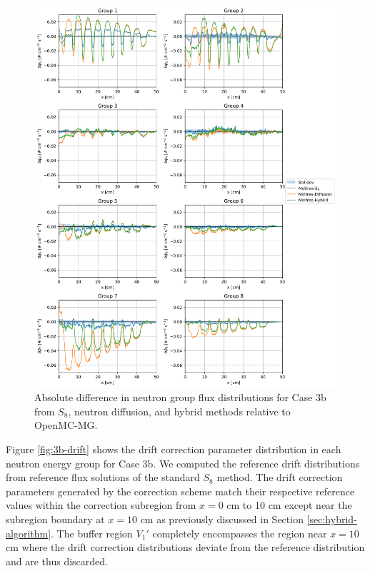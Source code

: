 \documentclass[letterpaper]{mc2025}
\begin{document}
\begin{figure}[htb!]
  \centering
  \includegraphics[width=\columnwidth]{case-3b-flux-diff}
  \caption{Absolute difference in neutron group flux distributions for Case 3b from $S_8$,
  neutron diffusion, and hybrid methods relative to OpenMC-MG.}
  \label{fig:3b-flux-diff}
\end{figure}

Figure \ref{fig:3b-drift} shows the drift correction parameter distribution in each neutron energy
group for Case 3b. We computed the reference drift distributions from reference flux
solutions of the standard $S_8$ method.
The drift correction parameters generated by the correction scheme match their respective reference
values within the correction subregion from $x=0$ cm to 10 cm except near the subregion boundary at
$x=10$ cm as previously discussed in Section \ref{sec:hybrid-algorithm}. The buffer region $V_1'$
completely encompasses the region near $x=10$ cm where the drift correction distributions deviate
from the reference distribution and are thus discarded.
\end{document}
